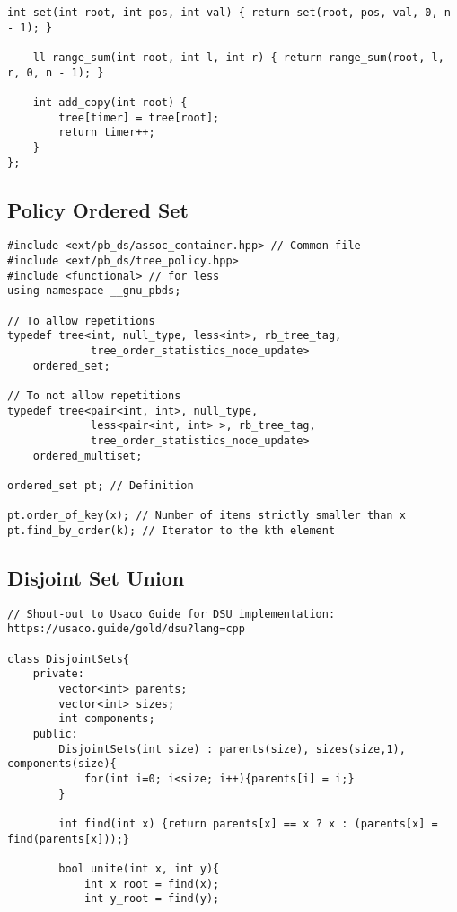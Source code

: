 \documentclass[10pt]{article}
\begin{document}
\begin{multicols*}{2}
\begin{lstlisting}[style=compactcpp]
	int set(int root, int pos, int val) { return set(root, pos, val, 0, n - 1); }

	ll range_sum(int root, int l, int r) { return range_sum(root, l, r, 0, n - 1); }

	int add_copy(int root) {
		tree[timer] = tree[root];
		return timer++;
	}
};
\end{lstlisting}

\subsection{Policy Ordered Set}

\begin{lstlisting}[style=compactcpp]
#include <ext/pb_ds/assoc_container.hpp> // Common file
#include <ext/pb_ds/tree_policy.hpp>
#include <functional> // for less
using namespace __gnu_pbds;

// To allow repetitions
typedef tree<int, null_type, less<int>, rb_tree_tag,
             tree_order_statistics_node_update>
    ordered_set;

// To not allow repetitions
typedef tree<pair<int, int>, null_type,
             less<pair<int, int> >, rb_tree_tag,
             tree_order_statistics_node_update>
    ordered_multiset;

ordered_set pt; // Definition

pt.order_of_key(x); // Number of items strictly smaller than x
pt.find_by_order(k); // Iterator to the kth element

\end{lstlisting}

\subsection{Disjoint Set Union}

\begin{lstlisting}[style=compactcpp]
// Shout-out to Usaco Guide for DSU implementation: https://usaco.guide/gold/dsu?lang=cpp
 
class DisjointSets{
    private:
        vector<int> parents;
        vector<int> sizes;
        int components;
    public:
        DisjointSets(int size) : parents(size), sizes(size,1), components(size){
            for(int i=0; i<size; i++){parents[i] = i;}
        }

        int find(int x) {return parents[x] == x ? x : (parents[x] = find(parents[x]));}

        bool unite(int x, int y){
            int x_root = find(x);
            int y_root = find(y);


\end{lstlisting}
\end{multicols*}
\end{document}

